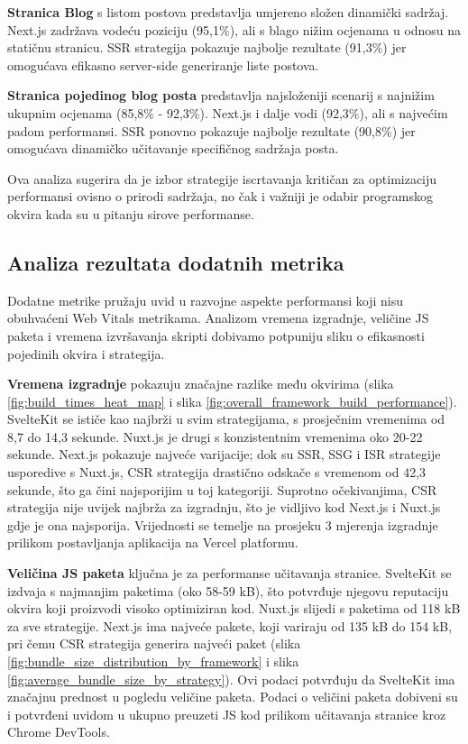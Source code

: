 \textbf{Stranica Blog} s listom postova predstavlja umjereno složen dinamički sadržaj. Next.js zadržava vodeću poziciju (95,1\%), ali s blago nižim ocjenama u odnosu na statičnu stranicu. SSR strategija pokazuje najbolje rezultate (91,3\%) jer omogućava efikasno server-side generiranje liste postova.

\textbf{Stranica pojedinog blog posta} predstavlja najsloženiji scenarij s najnižim ukupnim ocjenama (85,8\% - 92,3\%). Next.js i dalje vodi (92,3\%), ali s najvećim padom performansi. SSR ponovno pokazuje najbolje rezultate (90,8\%) jer omogućava dinamičko učitavanje specifičnog sadržaja posta.

\bigskip
Ova analiza sugerira da je izbor strategije iscrtavanja kritičan za optimizaciju performansi ovisno o prirodi sadržaja, no čak i važniji je odabir programskog okvira kada su u pitanju sirove performanse.

\subsection{Analiza rezultata dodatnih metrika}

Dodatne metrike pružaju uvid u razvojne aspekte performansi koji nisu obuhvaćeni Web Vitals metrikama. Analizom vremena izgradnje, veličine JS paketa i vremena izvršavanja skripti dobivamo potpuniju sliku o efikasnosti pojedinih okvira i strategija.

\textbf{Vremena izgradnje} pokazuju značajne razlike među okvirima (slika \ref{fig:build_times_heat_map} i slika  \ref{fig:overall_framework_build_performance}). SvelteKit se ističe kao najbrži u svim strategijama, s prosječnim vremenima od 8,7 do 14,3 sekunde. Nuxt.js je drugi s konzistentnim vremenima oko 20-22 sekunde. Next.js pokazuje najveće varijacije; dok su SSR, SSG i ISR strategije usporedive s Nuxt.js, CSR strategija drastično odskače s vremenom od 42,3 sekunde, što ga čini najsporijim u toj kategoriji. Suprotno očekivanjima, CSR strategija nije uvijek najbrža za izgradnju, što je vidljivo kod Next.js i Nuxt.js gdje je ona najsporija. Vrijednosti se temelje na prosjeku 3 mjerenja izgradnje prilikom postavljanja aplikacija na Vercel platformu.

\textbf{Veličina JS paketa} ključna je za performanse učitavanja stranice. SvelteKit se izdvaja s najmanjim paketima (oko 58-59 kB), što potvrđuje njegovu reputaciju okvira koji proizvodi visoko optimiziran kod. Nuxt.js slijedi s paketima od 118 kB za sve strategije. Next.js ima najveće pakete, koji variraju od 135 kB do 154 kB, pri čemu CSR strategija generira najveći paket (slika \ref{fig:bundle_size_distribution_by_framework} i slika  \ref{fig:average_bundle_size_by_strategy}). Ovi podaci potvrđuju da SvelteKit ima značajnu prednost u pogledu veličine paketa. Podaci o veličini paketa dobiveni su i potvrđeni uvidom u ukupno preuzeti JS kod prilikom učitavanja stranice kroz Chrome DevTools.

